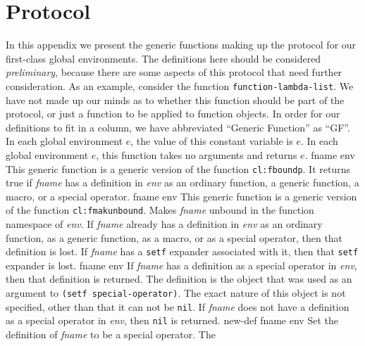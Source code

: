 \appendix

\section{Protocol}

In this appendix we present the generic functions making up the
protocol for our first-class global environments.  The definitions
here should be considered \emph{preliminary}, because there are some
aspects of this protocol that need further consideration.  As an
example, consider the function \texttt{function-lambda-list}.  We have
not made up our minds as to whether this function should be part of
the protocol, or just a function to be applied to function objects.
\vskip -0.05cm
In order for our definitions to fit in a column, we have abbreviated
``Generic Function'' as ``GF''.
\vskip -0.05cm
\vskip -0.2cm
In each global environment $e$, the value of this constant variable is
$e$.
\vskip -0.05cm
 {}
\vskip -0.2cm
In each global environment $e$, this function takes no arguments and
returns $e$.
\vskip -0.05cm
 {fname env}
\vskip -0.2cm
This generic function is a generic version of the \commonlisp{}
function \texttt{cl:fboundp}.
\vskip -0.05cm
It returns true if \textit{fname} has a definition in
\textit{env} as an ordinary function, a generic function, a
macro, or a special operator.
\vskip -0.05cm
 {fname env}
\vskip -0.2cm
This generic function is a generic version of the \commonlisp{}
function \texttt{cl:fmakunbound}.
\vskip -0.05cm
Makes \textit{fname} unbound in the function namespace of
\textit{env}.
\vskip -0.05cm
If \textit{fname} already has a definition in
\textit{env} as an ordinary function, as a generic function,
as a macro, or as a special operator, then that definition is lost.
\vskip -0.05cm
If \textit{fname} has a \texttt{setf} expander associated with
it, then that \texttt{setf} expander is lost.
\vskip -0.05cm
 {fname env}
\vskip -0.2cm
If \textit{fname} has a definition as a special operator in
\textit{env}, then that definition is returned.  The definition is
the object that was used as an argument to \texttt{(setf
  special-operator)}.  The exact nature of this object is not
specified, other than that it can not be \texttt{nil}.  If
\textit{fname} does not have a definition as a special operator in
\textit{env}, then \texttt{nil} is returned.
\vskip -0.05cm
 {new-def fname env}
\vskip -0.2cm
Set the definition of \textit{fname} to be a special operator.  The
